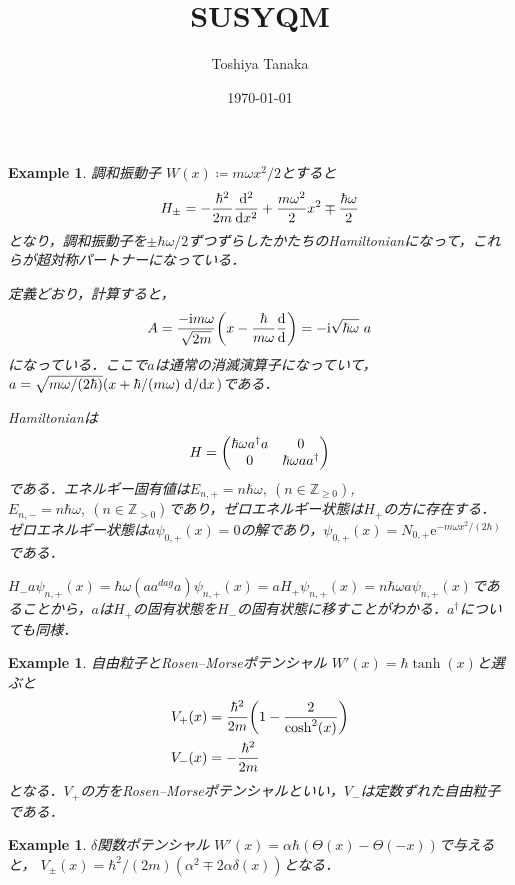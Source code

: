 \documentclass[english, dvipdfmx, a4paper]{jsarticle}
\title{SUSYQM}
\author{Toshiya Tanaka}
\date{\today}
\theoremstyle{break}
\newtheorem{eg}[thm]{Example}
\newcommand{\Z}{\mathbb{Z}}
\renewcommand{\i}{\mathrm{i}}
\newcommand{\e}{\mathrm{e}}
\begin{document}
	\begin{eg}{調和振動子}
		$W(x)\coloneqq m\omega x^2/2$とすると
		\begin{equation}
			H_{\pm} = -\frac{\hbar^2}{2m}\dv[2]{}{x} + \frac{m\omega^2}{2}x^2 \mp \frac{\hbar\omega}{2}
		\end{equation}
		となり，調和振動子を$\pm\hbar\omega/2$ずつずらしたかたちのHamiltonianになって，これらが超対称パートナーになっている．

		定義どおり，計算すると，
		\begin{equation}
			A = \frac{-\i m\omega}{\sqrt{2m}}\qty(x - \frac{\hbar}{m\omega}\dv{}{}) = -\i \sqrt{\hbar\omega}\ a
		\end{equation}
		になっている．ここで$a$は通常の消滅演算子になっていて，$a = \sqrt{m\omega/(2\hbar)}(x + \hbar/(m\omega)\dv*{}{x})$である．

		Hamiltonianは
		\begin{equation}
			H = 
			\mqty(\hbar\omega a^{\dag}a & 0 \\
			0 & \hbar\omega aa^{\dag})
		\end{equation}
		である．エネルギー固有値は$E_{n, +} = n\hbar\omega,\ (n\in\Z_{\geq0})$, $E_{n, -} = n\hbar\omega,\ (n\in\Z_{>0})$であり，ゼロエネルギー状態は$H_+$の方に存在する．
		ゼロエネルギー状態は$a\psi_{0, +}(x) = 0$の解であり，$\psi_{0, +}(x) = N_{0, +}\e^{-m\omega x^2/(2\hbar)}$である．


		$H_{-}a\psi_{n, +}(x) = \hbar\omega(aa^{dag}a)\psi_{n, +}(x) = aH_+\psi_{n, +}(x) = n\hbar\omega a\psi_{n, +}(x)$であることから，$a$は$H_+$の固有状態を$H_-$の固有状態に移すことがわかる．$a^{\dag}$についても同様．
	\end{eg}
	
	\begin{eg}{自由粒子とRosen--Morseポテンシャル}
		$W'(x) = \hbar\tanh(x)$と選ぶと
		\begin{align}
			V_+(x) &= \frac{\hbar^2}{2m}\qty(1-\frac{2}{\cosh^2(x)})\\
			V_-(x) &= -\frac{\hbar^2}{2m}
		\end{align}
		となる．$V_+$の方をRosen--Morseポテンシャルといい，$V_-$は定数ずれた自由粒子である．
	\end{eg}

	\begin{eg}{$\delta$関数ポテンシャル}
		$W'(x) = \alpha\hbar(\Theta(x) - \Theta(-x))$で与えると，
		$V_{\pm}(x) = \hbar^2/(2m)(\alpha^2 \mp 2\alpha\delta(x))$となる．
	\end{eg}
\end{document}
